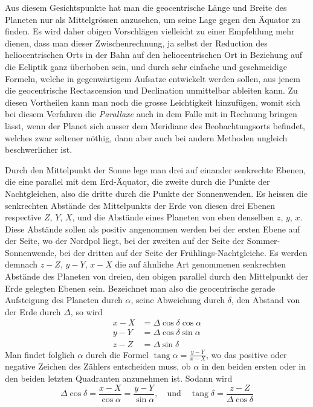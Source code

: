 Aus diesem Gesichtspunkte hat man die geocentrische Länge und Breite
des Planeten nur als Mittelgrössen anzusehen, um seine Lage gegen den Äquator
zu finden. Es wird daher obigen Vorschlägen vielleicht zu einer Empfehlung
mehr dienen, dass man dieser Zwischenrechnung, ja selbst der Reduction des
heliocentrischen Orts in der Bahn auf den heliocentrischen Ort in Beziehung auf
die Ecliptik ganz überhoben sein, und durch sehr einfache und geschmeidige
Formeln, welche in gegenwärtigem Aufsatze entwickelt werden sollen, aus jenem
die geocentrische Rectascension und Declination unmittelbar ableiten kann. Zu
diesen Vortheilen kann man noch die grosse Leichtigkeit hinzufügen, womit sich
bei diesem Verfahren die \textit{Parallaxe} auch in dem Falle mit in Rechnung bringen
lässt, wenn der Planet sich ausser dem Meridiane des Beobachtungsorts befindet,
welches zwar seltener nöthig, dann aber auch bei andern Methoden ungleich beschwerlicher
ist.

Durch den Mittelpunkt der Sonne lege man drei auf einander senkrechte
Ebenen, die eine parallel mit dem Erd-Äquator, die zweite durch die Punkte
der Nachtgleichen, also die dritte durch die Punkte der Sonnenwenden. Es
heissen die senkrechten Abstände des Mittelpunkts der Erde von diesen drei
Ebenen respective $Z$, $Y$, $X$, und die Abstände eines Planeten von eben denselben
$z$, $y$, $x$. Diese Abstände sollen als positiv angenommen werden bei der ersten
Ebene auf der Seite, wo der Nordpol liegt, bei der zweiten auf der Seite
der Sommer-Sonnenwende, bei der dritten auf der Seite der Frühlings-Nachtgleiche.
Es werden demnach $z-Z$, $y-Y$, $x-X$ die auf ähnliche Art genommenen
senkrechten Abstände des Planeten von dreien, den obigen parallel durch
den Mittelpunkt der Erde gelegten Ebenen sein. Bezeichnet man also die geocentrische
gerade Aufsteigung des Planeten durch $\alpha$, seine Abweichung durch
$\delta$, den Abstand von der Erde durch $\Delta$, so wird
\[
\begin{aligned}
x-X&=\Delta\cos\delta\cos\alpha\\
y-Y&=\Delta\cos\delta\sin\alpha\\
z-Z&=\Delta\sin\delta
\end{aligned}
\]
%
Man findet folglich $\alpha$ durch die Formel $\operatorname{tang}\alpha=\frac{y-Y}{x-X}$, wo das positive oder
negative Zeichen des Zählers entscheiden muss, ob $\alpha$ in den beiden ersten oder
in den beiden letzten Quadranten anzunehmen ist. Sodann wird
\[
\Delta\cos\delta=\frac{x-X}{\cos\alpha}=\frac{y-Y}{\sin\alpha},\quad
\text{und}\quad\operatorname{tang}\delta=\frac{z-Z}{\Delta\cos\delta}
\]

